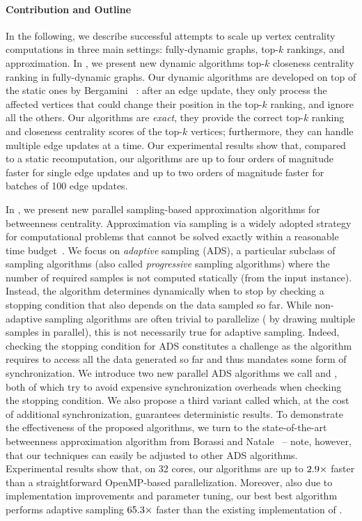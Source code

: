 \paragraph{Contribution and Outline}
In the following, we describe successful attempts to scale up vertex
centrality computations in three main settings: fully-dynamic graphs, top-$k$
rankings, and approximation.
In , we present new dynamic
algorithms top-$k$ closeness centrality ranking in fully-dynamic graphs.
Our dynamic algorithms are developed on top of the static ones by
Bergamini \etal~\cite{DBLP:journals/tkdd/BergaminiBCMM19}:
after an edge update, they only process the affected vertices that could
change their position in the top-$k$ ranking, and ignore all the others.
Our algorithms are \emph{exact}, \ie they provide the correct
top-$k$ ranking and closeness centrality scores of the top-$k$ vertices;
furthermore, they can handle multiple edge updates at a time.
Our experimental results show that, compared to a static recomputation,
our algorithms are up to four orders of magnitude faster for single
edge updates and up to two orders of magnitude faster for batches
of 100 edge updates.

In , we present new parallel sampling-based
approximation algorithms for betweenness centrality. Approximation via sampling
is a widely adopted strategy for computational problems that cannot be solved
exactly within a reasonable time budget~\cite{DBLP:books/tf/18/2018aam-1}. We
focus on \emph{adaptive} sampling (ADS), a particular subclass of sampling
algorithms (also called \emph{progressive} sampling algorithms) where the
number of required samples is not computed statically (\eg from the input
instance). Instead, the algorithm determines dynamically when to stop
by checking a stopping condition that also depends on the data sampled so far.
While non-adaptive sampling algorithms are often trivial to parallelize (\eg
by drawing multiple samples in parallel), this is not necessarily true for
adaptive sampling. Indeed, checking the stopping condition for ADS constitutes
a challenge as the algorithm requires to access all the data generated so far
and thus mandates some form of synchronization.
We introduce two new parallel ADS algorithms we call \localframe and \sharedframe,
both of which try to avoid expensive synchronization overheads when checking the
stopping condition.
We also propose a third variant called \indexedframe which, at the cost of
additional synchronization, guarantees deterministic results.
To demonstrate the effectiveness of the proposed
algorithms, we turn to the state-of-the-art \kadabra betweenness
approximation algorithm from Borassi and Natale~\cite{DBLP:conf/esa/BorassiN16} --
note, however, that our techniques can easily be adjusted to other ADS algorithms.
Experimental results show that, on 32 cores, our algorithms are up to
$\onedigit{\adsSuSfVsOmp}\times$ faster than a straightforward
OpenMP-based parallelization. Moreover, also due to implementation
improvements and parameter tuning, our best best algorithm performs
adaptive sampling $\onedigit{\adsSuSfVsOriginal}\times$ faster
than the existing implementation of \kadabra.

